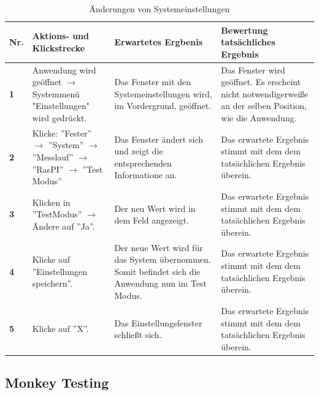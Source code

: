 \documentclass[parskip=full]{scrartcl}
\begin{document}
\begin{table}[h]
    \begin{tabular}{| p{} | p{} | p{} | p{} |}
        \hline
        \textbf{Nr.} & \textbf{Aktions- und Klickstrecke} & \textbf{Erwartetes Ergbenis}  & \textbf{ Bewertung tatsächliches Ergebnis} \\ \hline
        \textbf{1}
        & 
        Anwendung wird geöffnet $\rightarrow$ Systemmenü "Einstellungen" wird gedrückt.
        &
        Das Fenster mit den Systemeinstellungen wird, im Vordergrund, geöffnet.
        & 
        Das Fenster wird geöffnet. Es erscheint nicht notwendigerweiße an der selben Position, wie die Anwendung.
        \\ \hline
        
        \textbf{2}
        & 
        Klicke: ''Fester'' $\rightarrow$ ''System'' $\rightarrow$ ''Messlauf'' $\rightarrow$ ''RasPI'' $\rightarrow$ ''Test Modus''
        &
        Das Fenster ändert sich und zeigt die entsprechenden Informatione an.
        & 
        Das erwartete Ergebnis stimmt mit dem dem tatsächlichen Ergebnis überein.
        \\ \hline
        
        \textbf{3}
        & 
        Klicken in ''TestModus'' $\rightarrow$ Ändere auf ''Ja''.
        &
        Der neu Wert wird in dem Feld angezeigt.
        & 
        Das erwartete Ergebnis stimmt mit dem dem tatsächlichen Ergebnis überein.
        \\ \hline
        
        
        \textbf{4}
        & 
        Klicke auf ''Einstellungen speichern''.
        &
        Der neue Wert wird für das System übernommen. Somit befindet sich die Anwendung nun im Test Modus.
        & 
        Das erwartete Ergebnis stimmt mit dem dem tatsächlichen Ergebnis überein.
        \\ \hline
        
        \textbf{5}
        & 
        Klicke auf ''X''.
        &
        Das Einstellungsfenster schließt sich.
        & 
        Das erwartete Ergebnis stimmt mit dem dem tatsächlichen Ergebnis überein.
        \\ \hline
        
    \end{tabular}
    \caption{Änderungen von Systemeinstellungen}
    \label{SystemEinstellungKlickStrecke}
\end{table} 
\subsection{Monkey Testing}
\end{document}
